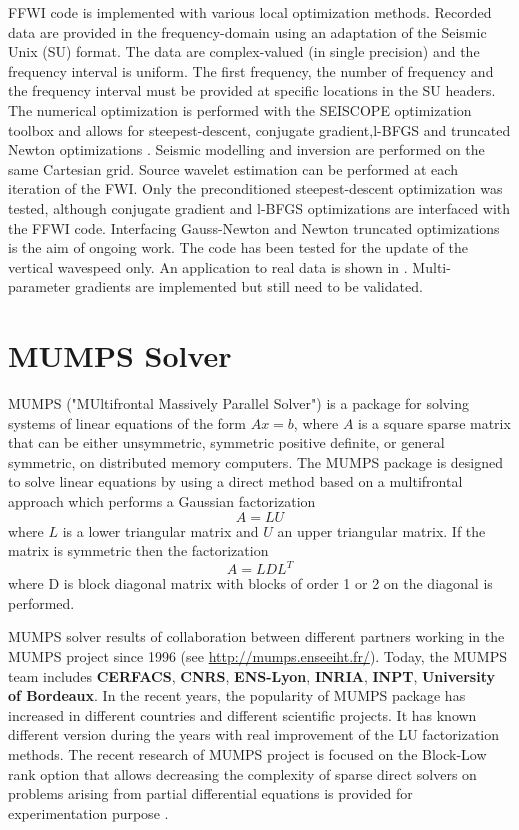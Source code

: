 FFWI code is implemented with various local optimization methods. Recorded data are provided in the frequency-domain using an adaptation of the Seismic Unix (SU) format. The data are complex-valued (in single precision) and the frequency interval is uniform. The first frequency, the number of frequency and the frequency interval must be provided at specific locations in the SU headers. The numerical optimization is performed with the SEISCOPE optimization toolbox and allows for steepest-descent, conjugate gradient,l-BFGS and truncated Newton optimizations \cite{Metivier2016}. Seismic modelling and inversion are performed on the same Cartesian grid. Source wavelet estimation can be performed at each iteration of the FWI. Only the preconditioned steepest-descent optimization was tested, although conjugate gradient and l-BFGS optimizations are interfaced with the FFWI code. Interfacing Gauss-Newton and Newton truncated optimizations is the aim of ongoing work. The code has been tested for the update of the vertical wavespeed only. An application to real data is shown in \cite{Operto2015}. Multi-parameter gradients are implemented but still need to be validated.

\section{MUMPS Solver}
MUMPS ("MUltifrontal Massively Parallel Solver") is a package for solving systems of linear equations of the form $ Ax = b$, where $ A $ is a square sparse matrix that can be either unsymmetric, symmetric positive definite, or general symmetric, on distributed memory computers. The MUMPS package is designed to solve linear equations by using a direct method based on a multifrontal approach which performs a Gaussian factorization
$$ A = LU $$ 
where $ L $ is a lower triangular matrix and $ U $ an upper triangular matrix. If the matrix is symmetric then
the factorization
$$ A = LDL^{T}$$
where D is block diagonal matrix with blocks of order 1 or 2 on the diagonal is performed. 

MUMPS solver results of collaboration between different partners working in the MUMPS project since 1996 (see \url{http://mumps.enseeiht.fr/}). Today, the MUMPS team includes \textbf{CERFACS}, \textbf{CNRS}, \textbf{ENS-Lyon}, \textbf{INRIA}, \textbf{INPT}, \textbf{University of Bordeaux}. In the recent years, the popularity of MUMPS package has increased in different countries and different scientific projects. It has known different version during the years with real improvement of the LU factorization methods. The recent research of MUMPS project is focused on the Block-Low rank option that allows decreasing the complexity of sparse direct solvers on problems arising from partial differential equations is provided for experimentation purpose \cite{Amestoy2013}. 

